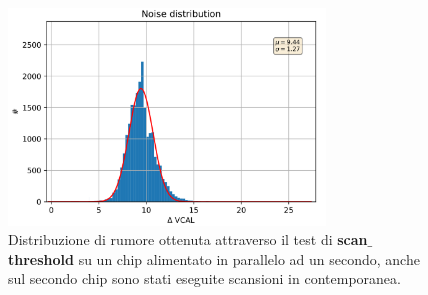 \begin{figure}
\centering
\includegraphics[width=0.75\textwidth]{Immagini/NoiseParallel}
\caption{Distribuzione di rumore ottenuta attraverso il test di \textbf{scan$\_$threshold} su un chip alimentato in parallelo ad un secondo, anche sul secondo chip sono stati eseguite scansioni in contemporanea.}
\label{noiseparallel}
\end{figure}
